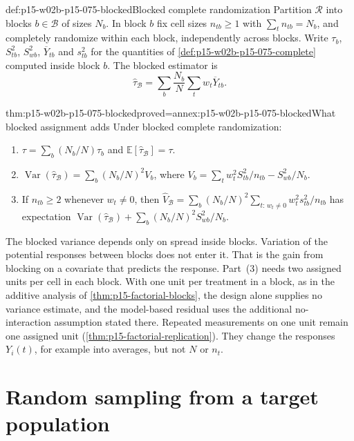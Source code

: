 \begin{hbdefinition}{def:p15-w02b-p15-075-blocked}{Blocked complete randomization}
Partition \(\mathcal R\) into blocks \(b\in\mathcal B\) of sizes \(N_b\).
In block \(b\) fix cell sizes \(n_{tb}\geq1\) with
\(\sum_tn_{tb}=N_b\), and completely randomize within each block,
independently across blocks. Write \(\tau_b\), \(S_{tb}^2\),
\(S_{wb}^2\), \(\overline Y_{tb}\) and \(s_{tb}^2\) for the quantities of
\cref{def:p15-w02b-p15-075-complete} computed inside block \(b\). The
blocked estimator is
\[
 \widehat\tau_{\mathcal B}=\sum_b\frac{N_b}{N}\sum_tw_t\overline Y_{tb}.
\]
\end{hbdefinition}

\begin{hbtheorem}{thm:p15-w02b-p15-075-blocked}{proved=annex:p15-w02b-p15-075-blocked}{What blocked assignment adds}
Under blocked complete randomization:
\begin{enumerate}
\item \(\tau=\sum_b(N_b/N)\tau_b\) and
\(\mathbb E[\widehat\tau_{\mathcal B}]=\tau\).
\item \(\operatorname{Var}(\widehat\tau_{\mathcal B})
=\sum_b(N_b/N)^2V_b\), where
\(V_b=\sum_tw_t^2S_{tb}^2/n_{tb}-S_{wb}^2/N_b\).
\item If \(n_{tb}\geq2\) whenever \(w_t\neq0\), then
\(\widehat V_{\mathcal B}=\sum_b(N_b/N)^2\sum_{t:\,w_t\neq0}w_t^2s_{tb}^2/n_{tb}\)
has expectation
\(\operatorname{Var}(\widehat\tau_{\mathcal B})
+\sum_b(N_b/N)^2S_{wb}^2/N_b\).
\end{enumerate}
\end{hbtheorem}

The blocked variance depends only on spread inside blocks. Variation of the
potential responses between blocks does not enter it. That is the gain from
blocking on a covariate that predicts the response. Part~(3) needs two
assigned units per cell in each block. With one unit per treatment in a block,
as in the additive analysis of \cref{thm:p15-factorial-blocks}, the design
alone supplies no variance estimate, and the model-based residual uses the
additional no-interaction assumption stated there. Repeated measurements on one
unit remain one assigned unit (\cref{thm:p15-factorial-replication}). They
change the responses \(Y_i(t)\), for example into averages, but not \(N\) or
\(n_t\).

\section{Random sampling from a target population}
\label{sec:p15-w02b-p15-075-sampling}

